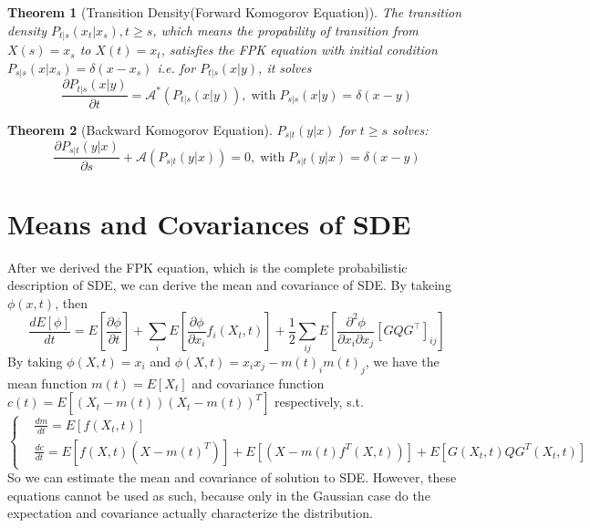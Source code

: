 \documentclass{article}
\newtheorem{theorem}{Theorem}
\begin{document}
\begin{theorem}[Transition Density(Forward Komogorov Equation)]
     The transition density $P_{t|s}(x_t|x_s),t\geq s$, which means the propability of transition from $X(s)=x_s$ to $X(t)=x_t$, satisfies the FPK equation with initial condition $P_{s|s}(x|x_s)=\delta(x-x_s)$
     i.e. for $P_{t|s}(x|y)$, it solves
     \begin{equation}
        \frac{\partial P_{t|s}(x|y)}{\partial t}=\mathcal{A}^*(P_{t|s}(x|y)), \operatorname{with} P_{s|s}(x|y)=\delta(x-y)
     \end{equation}
\end{theorem}

\begin{theorem}[Backward Komogorov Equation]
    $P_{s|t}(y|x)$ for $t\geq s$ solves:
    \begin{equation}
        \frac{\partial P_{s|t}(y|x)}{\partial s} + \mathcal{A}(P_{s|t}(y|x))=0, \operatorname{ with }P_{s|t}(y|x) = \delta(x-y)
    \end{equation}
\end{theorem}

\section{Means and Covariances of SDE}
After we derived the FPK equation, which is the complete probabilistic description of SDE, we can derive the mean and covariance of SDE.
By takeing $\phi(x, t)$, then
\begin{equation}
    \frac{d E[\phi]}{d t}=E\left[\frac{\partial \phi}{\partial t}\right]+\sum_{i} E\left[\frac{\partial \phi}{\partial x_{i}} f_{i}(X_t, t)\right]+\frac{1}{2} \sum_{i j} E\left[\frac{\partial^{2} \phi}{\partial x_{i} \partial x_{j}}\left[G Q G^{\top}\right]_{i j}\right]
\end{equation}
By taking $\phi(X, t)=x_i$ and $\phi(X, t)=x_ix_j-m(t)_im(t)_j$, we have the mean function $m(t)=E[X_t]$ 
and covariance function $c(t)=E\left[\left(X_t-m(t)\right)\left(X_t-m(t)\right)^T\right]$ respectively, s.t.
\begin{equation}\label{SDEMC}
    \left\{
        \begin{aligned}
            &\frac{d m}{d t}=E\left[f(X_t, t)\right]\\
            &\frac{d c}{d t}=E\left[f(X, t)(X-m(t)^T)\right]+E\left[(X-m(t)f^T(X, t))\right]+E\left[G(X_t, t)QG^T(X_t, t)\right]
        \end{aligned}
    \right.
\end{equation}
So we can estimate the mean and covariance of solution to SDE. However, these equations cannot be used as such, 
because only in the Gaussian case do the expectation and covariance actually characterize the distribution. 
\end{document}
